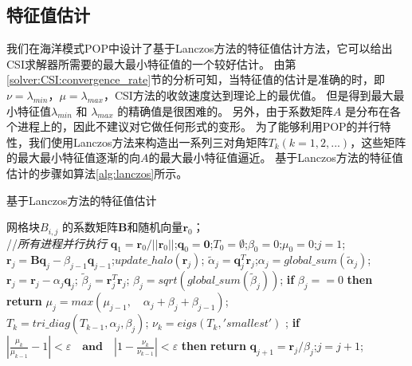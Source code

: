 \subsection{特征值估计}
\label{solver:eigs}
我们在海洋模式POP中设计了基于Lanczos方法的特征值估计方法，它可以给出CSI求解器所需要的最大最小特征值的一个较好估计。
由第\ref{solver:CSI:convergence_rate}节的分析可知，当特征值的估计是准确的时，即$\nu = \lambda_{min}$，$\mu =\lambda_{max}$，CSI方法的收敛速度达到理论上的最优值。 
但是得到最大最小特征值$\lambda_{min}$ 和 $\lambda_{max}$ 的精确值是很困难的。
另外，由于系数矩阵$A$ 是分布在各个进程上的，因此不建议对它做任何形式的变形。  
为了能够利用POP的并行特性，我们使用Lanczos方法来构造出一系列三对角矩阵$T_k(k=1,2,...)$，这些矩阵的最大最小特征值逐渐的向$A$的最大最小特征值逼近。
基于Lanczos方法的特征值估计的步骤如算法\ref{alg:lanczos}所示。 
\begin{algorithm}
\caption{ 基于Lanczos方法的特征值估计}
\label{alg:lanczos}
\begin{algorithmic}[1]
\REQUIRE  网格块$B_{i,j}$ 的系数矩阵$\textbf{B}$和随机向量$\textbf{r}_0$；\\
 //\qquad    \textit{所有进程并行执行}
\STATE $\textbf{q}_1 = \textbf{r}_0/||\textbf{r}_0||$;\quad $\textbf{q}_0=\textbf{0}$;\quad $T_0=\emptyset$;\quad $\beta_0 =0$;\quad  $\mu_0 =0$;\quad $j=1$;
\STATE $\textbf{r}_j=\textbf{B}\textbf{q}_j-\beta_{j-1}\textbf{q}_{j-1}$;\quad $update\_halo(\textbf{r}_j)$;
\STATE $\tilde{\alpha}_j =\textbf{q}_j^T\textbf{r}_j$;\quad $\alpha_j=global\_sum(\tilde{\alpha}_j)$; 
\STATE $\textbf{r}_j=\textbf{r}_j-\alpha_{j}\textbf{q}_{j}$;
\STATE $\tilde{\beta}_j = \textbf{r}_j^T\textbf{r}_j$; \quad $\beta_j=sqrt(global\_sum(\tilde{\beta}_j))$;
\STATE \textbf{if} $\beta_j == 0$ \textbf{then} \textbf{return}
\STATE $\mu_j = max(\mu_{j-1}, \quad \alpha_j+\beta_j+\beta_{j-1})$; \label{lanczos_gersh} \\
\STATE $T_k=tri\_diag(T_{k-1},\alpha_j,\beta_j)$; \quad $\nu_k = eigs(T_k,'smallest')$ ; \label{lanczos_tridiag} 
\STATE \textbf{if} $|\frac{\mu_k}{\mu_{k-1}} -1 |< \varepsilon\quad\textbf{and}\quad|1- \frac{\nu_k}{\nu_{k-1}}|< \varepsilon$ \textbf{then} \textbf{return}
\STATE $\textbf{q}_{j+1}= \textbf{r}_j/\beta_j$;\quad $j=j+1$;
\ENDWHILE
\end{algorithmic}
\end{algorithm}
 
